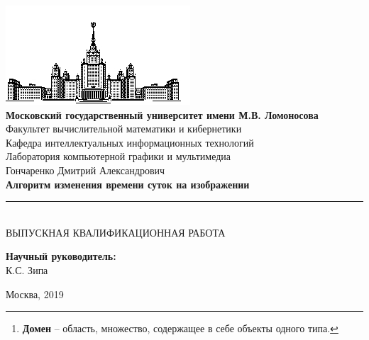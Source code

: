 \documentclass[11pt,a4paper]{extarticle}
\begin{document}
\begin{titlepage}
	\begin{centering}
		\includegraphics{img/msu}\\
		\large{
			\textbf{Московский государственный университет имени М.В. Ломоносова}\\
			Факультет вычислительной математики и кибернетики\\
			Кафедра интеллектуальных информационных технологий\\
			Лаборатория компьютерной графики и мультимедиа\\[4cm]
		}
		\Large{
			Гончаренко Дмитрий Александрович\\[0.9cm]
		}
		\Large{
			\textbf{Алгоритм изменения времени суток на изображении}\\
		}
		\rule[0.3cm]{14cm}{0.02cm}\\[1cm]
		\large{
			ВЫПУСКНАЯ КВАЛИФИКАЦИОННАЯ РАБОТА\\[4cm]
		}
	\end{centering}
	\begin{flushright}
		\large{
			\textbf{Научный руководитель:}\\ К.С. Зипа\\
		}
	\end{flushright}
	\begin{center}
		\vfill
		\large{
			Москва, 2019
		}
	\end{center}
\end{titlepage}

\begin{abstract}
	Перенос изображений -- это класс задач компьютерного зрения, цель которого состоит в извлечении стилевых признаков из изображений (или множеств изображений) и последующем применении предобученной модели к базовому изображению для генерации новых изображений с заданными стилями с сохранением семантической информации.
	Данная сфера значительное продвинулась благодаря современным вычислительным возможностям, в частности, переносе обучения на графические процессоры, GPU.
	За последние несколько лет появилось немало исследовательских работ на тему междоменных\footnote{
		\textbf{Домен} -- область, множество, содержащее в себе объекты одного типа. 
	} переносов изображений, стилей и колоризации.
	В данной работе рассматриваются современные подходы к переносу изображений, применимые к задаче изменения времени суток на изображении.
	Проводится описание нейросетевых моделей, обоснование и выбор метода и сравнительный анализ серии экспериментов обучения.
	Обученую модель и полученные результаты переноса можно использовать для аугментации данных в смежных задачах машинного обучения.
\end{abstract}
\end{document}
